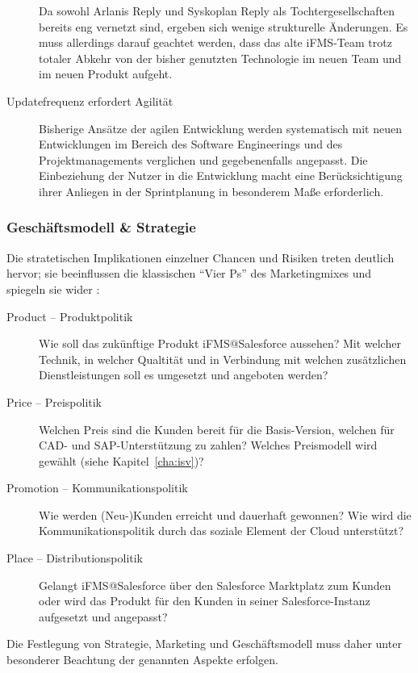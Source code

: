 \begin{description}
Da sowohl Arlanis Reply und Syskoplan Reply als Tochtergesellschaften bereits 
eng vernetzt sind, ergeben sich wenige strukturelle Änderungen. Es muss 
allerdings darauf geachtet werden, dass das alte iFMS-Team trotz totaler Abkehr 
von der bisher genutzten Technologie im neuen Team und im neuen Produkt 
aufgeht.
	\item[Updatefrequenz erfordert Agilität] Bisherige Ansätze der agilen 
Entwicklung werden systematisch mit neuen Entwicklungen im Bereich des Software 
Engineerings und des Projektmanagements verglichen und gegebenenfalls 
angepasst. Die Einbeziehung der Nutzer in die Entwicklung macht eine 
Berücksichtigung ihrer Anliegen in der Sprintplanung in besonderem Maße 
erforderlich.
\end{description}

\subsubsection{Geschäftsmodell \& Strategie}
Die stratetischen Implikationen einzelner Chancen und Risiken treten deutlich 
hervor; sie beeinflussen die klassischen "`Vier Ps"' des Marketingmixes und 
spiegeln sie wider :
\begin{description}
	\item[Product -- Produktpolitik] Wie soll das 
zukünftige Produkt iFMS@Salesforce aussehen? Mit welcher Technik, in welcher 
Qualtität und in Verbindung mit welchen zusätzlichen Dienstleistungen soll es 
umgesetzt und angeboten werden?
	\item[Price -- Preispolitik] Welchen Preis sind die 
Kunden bereit für die Basis-Version, welchen für CAD- und SAP-Unterstützung zu zahlen? 
Welches Preismodell wird gewählt (siehe Kapitel~\ref{cha:isv})? 
	\item[Promotion -- Kommunikationspolitik] Wie werden (Neu-)Kunden 
erreicht und dauerhaft gewonnen? Wie wird die Kommunikationspolitik durch das 
soziale Element der Cloud unterstützt?
	\item[Place --  Distributionspolitik] Gelangt iFMS@Salesforce über den 
Salesforce Marktplatz zum Kunden oder wird das Produkt für den Kunden in seiner 
Salesforce-Instanz aufgesetzt und angepasst?
\end{description}
Die Festlegung von Strategie, Marketing und Geschäftsmodell muss daher unter 
besonderer Beachtung der genannten Aspekte erfolgen. 

